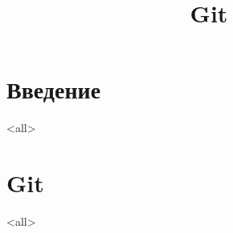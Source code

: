 
\title{Git}



\begin{frame}
  \frametitle{}
  \titlepage
\end{frame}

\section{Введение}
\mode<all>{}

\section{Git}
\mode<all>{}


